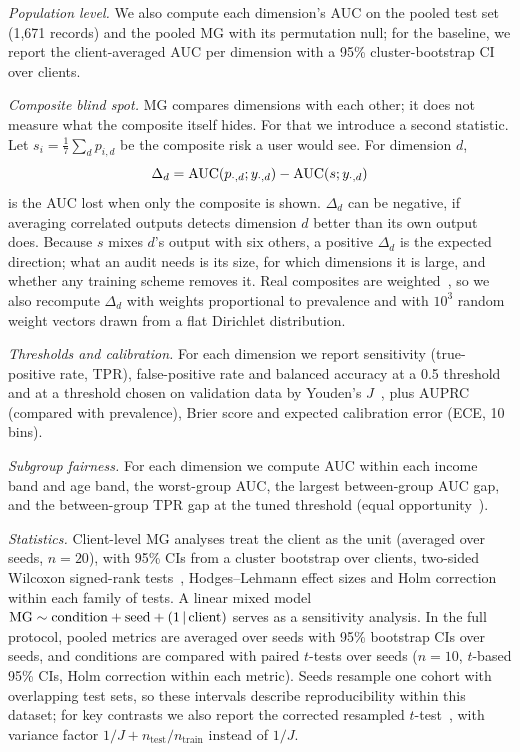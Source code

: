 \emph{Population level.} We also compute each dimension's AUC on the pooled test set (1,671 records) and the pooled MG with its permutation null; for the baseline, we report the client-averaged AUC per dimension with a 95\% cluster-bootstrap CI over clients.

\emph{Composite blind spot.} MG compares dimensions with each other; it does not measure what the composite itself hides. For that we introduce a second statistic. Let $s_i = \frac{1}{7}\sum_d p_{i,d}$ be the composite risk a user would see. For dimension $d$,
\begin{equation}
\Delta_d = \mathrm{AUC}(p_{\cdot,d}; y_{\cdot,d}) - \mathrm{AUC}(s; y_{\cdot,d})
\end{equation}
is the AUC lost when only the composite is shown. $\Delta_d$ can be negative, if averaging correlated outputs detects dimension $d$ better than its own output does. Because $s$ mixes $d$'s output with six others, a positive $\Delta_d$ is the expected direction; what an audit needs is its size, for which dimensions it is large, and whether any training scheme removes it. Real composites are weighted~\cite{doherty2025}, so we also recompute $\Delta_d$ with weights proportional to prevalence and with $10^3$ random weight vectors drawn from a flat Dirichlet distribution.

\emph{Thresholds and calibration.} For each dimension we report sensitivity (true-positive rate, TPR), false-positive rate and balanced accuracy at a 0.5 threshold and at a threshold chosen on validation data by Youden's $J$~\cite{youden1950}, plus AUPRC (compared with prevalence), Brier score and expected calibration error (ECE, 10 bins).

\emph{Subgroup fairness.} For each dimension we compute AUC within each income band and age band, the worst-group AUC, the largest between-group AUC gap, and the between-group TPR gap at the tuned threshold (equal opportunity~\cite{hardt2016}).

\emph{Statistics.} Client-level MG analyses treat the client as the unit (averaged over seeds, $n{=}20$), with 95\% CIs from a cluster bootstrap over clients, two-sided Wilcoxon signed-rank tests~\cite{wilcoxon1945}, Hodges--Lehmann effect sizes and Holm correction~\cite{holm1979} within each family of tests. A linear mixed model $\mathrm{MG} \sim \text{condition} + \text{seed} + (1\,|\,\text{client})$ serves as a sensitivity analysis. In the full protocol, pooled metrics are averaged over seeds with 95\% bootstrap CIs over seeds, and conditions are compared with paired $t$-tests over seeds ($n{=}10$, $t$-based 95\% CIs, Holm correction within each metric). Seeds resample one cohort with overlapping test sets, so these intervals describe reproducibility within this dataset; for key contrasts we also report the corrected resampled $t$-test~\cite{nadeau2003}, with variance factor $1/J + n_{\text{test}}/n_{\text{train}}$ instead of $1/J$.
